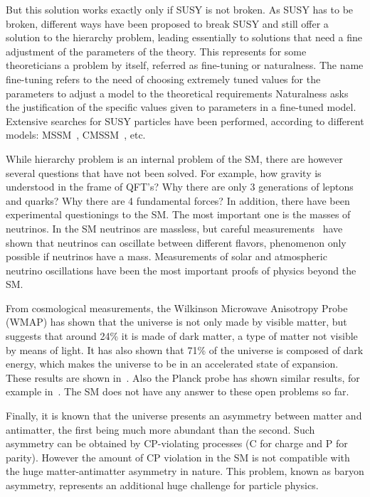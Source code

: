 But this solution works exactly only if SUSY is not broken. As SUSY has to be broken, different ways have been proposed to break SUSY and still offer a solution to the hierarchy problem, leading essentially to solutions that need a fine adjustment of the parameters of the theory. This represents for some theoreticians a problem by itself, referred as fine-tuning or naturalness. The name fine-tuning refers to the need of choosing extremely tuned values for the parameters to adjust a model to the theoretical requirements Naturalness asks the justification of the specific values given to parameters in a fine-tuned model. Extensive searches for SUSY particles have been performed, according to different models: MSSM~\cite{Khachatryan:2014wca,Aad:2014vgg}, CMSSM~\cite{Agashe:2014kda}, etc.

While hierarchy problem is an internal problem of the SM, there are however several questions that have not been solved. For example, how gravity is understood in the frame of QFT's? Why there are only 3 generations of leptons and quarks? Why there are 4 fundamental forces? In addition, there have been experimental questionings to the SM. The most important one is the masses of neutrinos. In the SM neutrinos are massless, but careful measurements~\cite{Ashie:2004mr, Weinheimer:2013hya} have shown that neutrinos can oscillate between different flavors, phenomenon only possible if neutrinos have a mass. Measurements of solar and atmospheric neutrino oscillations have been the most important proofs of physics beyond the SM. 

From cosmological measurements, the Wilkinson Microwave Anisotropy Probe (WMAP) has shown that the universe is not only made by visible matter, but suggests that around 24\% it is made of dark matter, a type of matter not visible by means of light. It has also shown that 71\% of the universe is composed of dark energy, which makes the universe to be in an accelerated state of expansion. These results are shown in~\cite{2013ApJS..208...20B, 2013ApJS..208...19H}. Also the Planck probe has shown similar results, for example in~\cite{Planck:2015xua}. The SM does not have any answer to these open problems so far. 

Finally, it is known that the universe presents an asymmetry between matter and antimatter, the first being much more abundant than the second. Such asymmetry can be obtained by CP-violating processes (C for charge and P for parity). However the amount of CP violation in the SM is not compatible with the huge matter-antimatter asymmetry in nature. This problem, known as baryon asymmetry, represents an additional huge challenge for particle physics. 

